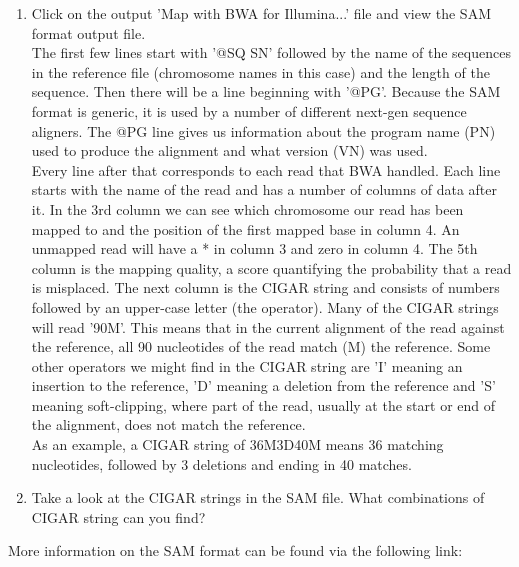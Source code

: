 \documentclass[12pt,a4paper]{article}
\begin{document}
\begin{enumerate}
  \item Click on the output 'Map with BWA for Illumina...' file and view the
SAM format output file. \\

  The first few lines start with '@SQ SN' followed by the name of the
  sequences in the reference file (chromosome names in this case) and
  the length of the sequence. Then there will be a line beginning with
  '@PG'. Because the SAM format is generic, it is used by a number of
  different next-gen sequence aligners. The @PG line gives us
  information about the program name (PN) used to produce the
  alignment and what version (VN) was used.\\

  Every line after that corresponds to each read that BWA
  handled. Each line starts with the name of the read and has a number
  of columns of data after it. In the 3rd column we can see which
  chromosome our read has been mapped to and the position of the first
  mapped base in column 4. An unmapped read will have a * in column 3
  and zero in column 4. The 5th column is the mapping quality, a score
  quantifying the probability that a read is misplaced. The next
  column is the CIGAR string and consists of numbers followed by an
  upper-case letter (the operator). Many of the CIGAR strings will
  read '90M'. This means that in the current alignment of the read
  against the reference, all 90 nucleotides of the read match (M) the
  reference. Some other operators we might find in the CIGAR string
  are 'I' meaning an insertion to the reference, 'D' meaning a
  deletion from the reference and 'S' meaning soft-clipping, where
  part of the read, usually at the start or end of the alignment, does
  not match the reference. \\

  As an example, a CIGAR string of 36M3D40M means 36 matching
  nucleotides, followed by 3 deletions and ending in 40 matches.  \\

  \item Take a look at the CIGAR strings in the SAM file. What
    combinations of CIGAR string can you find? \\%
\end{enumerate}
More information on the SAM format can be found via the following
link: \\
\end{document}
